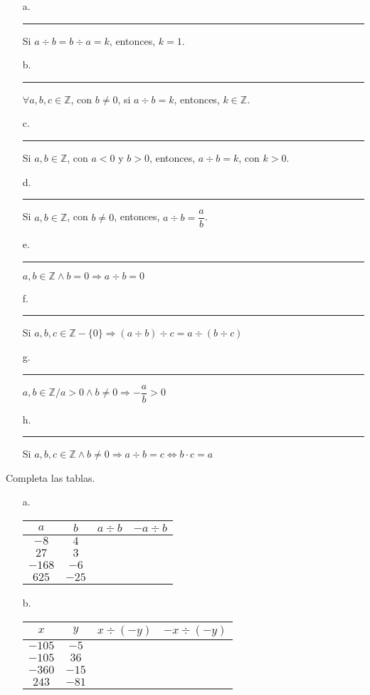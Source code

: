 \documentclass[spanish,letterpaper, 11pt, addpoints, answers]{exam}
\begin{document}
\begin{questions}
\begin{itemize}
  \item[a.] \rule{1cm}{0.4pt} Si $a\div b=b\div a=k$, entonces, $k=1$. 
  \item[b.] \rule{1cm}{0.4pt} $\forall a,b,c\in \mathbb{Z}$, con $b\neq 0$, si $a\div b=k$, entonces, $k\in \mathbb{Z}$.
  \item[c.] \rule{1cm}{0.4pt} Si $a,b\in \mathbb{Z}$, con $a<0$ y $b>0$, entonces, $a\div b=k$, con $k>0$.
  \item[d.] \rule{1cm}{0.4pt} Si $a,b\in \mathbb{Z}$, con $b\neq 0$, entonces, $a\div b=\dfrac{a}{b}$.
  \item[e.] \rule{1cm}{0.4pt} $a,b\in \mathbb{Z} \wedge b=0 \Rightarrow a\div b=0$
  \item[f.] \rule{1cm}{0.4pt} Si $a,b,c\in \mathbb{Z}-\{0\}\Rightarrow (a\div b)\div c=a\div (b\div c)$ 
  \item[g.] \rule{1cm}{0.4pt} $a,b\in \mathbb{Z}/a>0 \wedge b\neq 0\Rightarrow -\dfrac{a}{b}>0$
  \item[h.] \rule{1cm}{0.4pt} Si $a,b,c\in \mathbb{Z} \wedge b\neq 0\Rightarrow a\div b=c\Leftrightarrow b\cdot c=a$
\end{itemize}

\question Completa las tablas.

\begin{itemize}
  \item[a.]
\begin{center}
  \begin{tabular}{|c|c|>{\centering\arraybackslash}p{2.5cm}|>{\centering\arraybackslash}p{2.5cm}|}\hline
    $a$ & $b$ & $a\div b$ & $-a\div b$ \\ \hline
    $-8$ & $4$ && \\ \hline
    $27$ & $3$ && \\ \hline
    $-168$ & $-6$ && \\ \hline
    $625$ & $-25$ && \\ \hline
  \end{tabular}
\end{center}
\vspace{0.5cm}
\item[b.]
\begin{center}
  \begin{tabular}{|c|c|>{\centering\arraybackslash}p{3.5cm}|>{\centering\arraybackslash}p{3.5cm}|}\hline
  $x$&$y$&$x\div (-y)$&$-x\div (-y)$\\ \hline
  $-105$&$-5$&&\\ \hline
  $-105$&$36$&&\\ \hline
  $-360$&$-15$&&\\ \hline
  $243$&$-81$&&\\ \hline
  

\end{tabular}
\end{center}
\end{itemize}
\end{questions}
\end{document}
